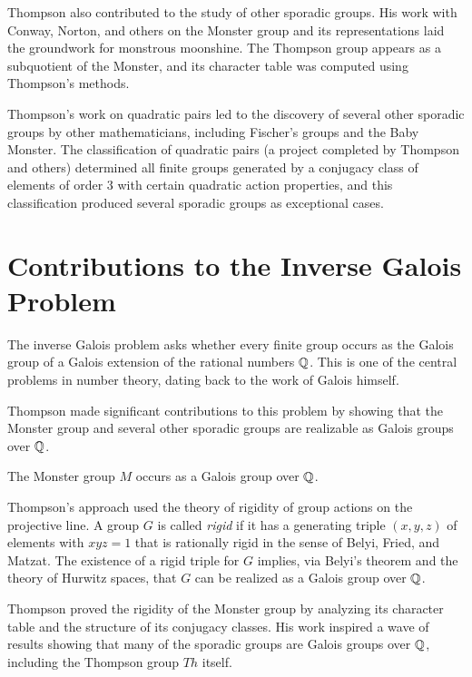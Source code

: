 Thompson also contributed to the study of other sporadic groups. His work with Conway, Norton, and others on the Monster group and its representations laid the groundwork for monstrous moonshine. The Thompson group appears as a subquotient of the Monster, and its character table was computed using Thompson's methods.

Thompson's work on quadratic pairs led to the discovery of several other sporadic groups by other mathematicians, including Fischer's groups and the Baby Monster. The classification of quadratic pairs (a project completed by Thompson and others) determined all finite groups generated by a conjugacy class of elements of order 3 with certain quadratic action properties, and this classification produced several sporadic groups as exceptional cases.

\section{Contributions to the Inverse Galois Problem}

The inverse Galois problem asks whether every finite group occurs as the Galois group of a Galois extension of the rational numbers \(\mathbb{Q}\). This is one of the central problems in number theory, dating back to the work of Galois himself.

Thompson made significant contributions to this problem by showing that the Monster group and several other sporadic groups are realizable as Galois groups over \(\mathbb{Q}\).

\begin{theorem}[Thompson, 1984]
The Monster group \(M\) occurs as a Galois group over \(\mathbb{Q}\).
\end{theorem}

Thompson's approach used the theory of rigidity of group actions on the projective line. A group \(G\) is called \textit{rigid} if it has a generating triple \((x,y,z)\) of elements with \(xyz = 1\) that is rationally rigid in the sense of Belyi, Fried, and Matzat. The existence of a rigid triple for \(G\) implies, via Belyi's theorem and the theory of Hurwitz spaces, that \(G\) can be realized as a Galois group over \(\mathbb{Q}\).

Thompson proved the rigidity of the Monster group by analyzing its character table and the structure of its conjugacy classes. His work inspired a wave of results showing that many of the sporadic groups are Galois groups over \(\mathbb{Q}\), including the Thompson group \(Th\) itself.

